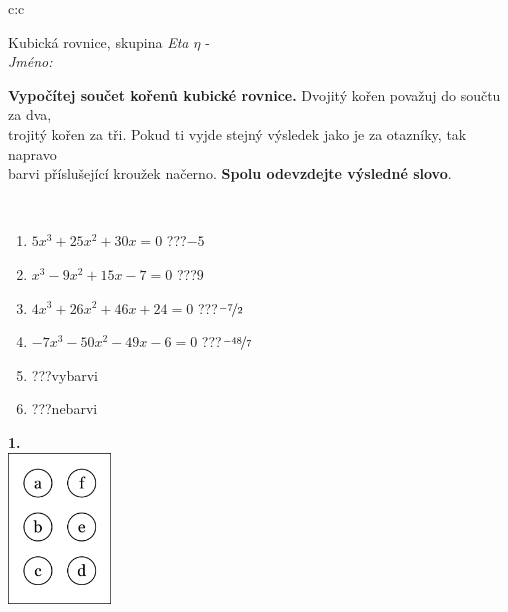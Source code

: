 \documentclass[10pt]{report}
\begin{document}
\begin{tabular}{c:c}
\begin{minipage}[c][104.5mm][t]{0.5\linewidth}
\begin{center}
\vspace{7mm}
{\huge Kubická rovnice, skupina \textit{Eta $\eta$} -}\\[5mm]
\textit{Jméno:}\phantom{xxxxxxxxxxxxxxxxxxxxxxxxxxxxxxxxxxxxxxxxxxxxxxxxxxxxxxxxxxxxxxxxx}\\[5mm]
\begin{minipage}{0.95\linewidth}
\begin{center}
\textbf{Vypočítej součet kořenů kubické rovnice.} Dvojitý kořen považuj do součtu za dva,\\trojitý kořen za tři. Pokud ti vyjde stejný výsledek jako je za otazníky, tak napravo\\barvi příslušející kroužek načerno. \textbf{Spolu odevzdejte výsledné slovo}.
\end{center}
\end{minipage}
\\[1mm]
\begin{minipage}{0.79\linewidth}
\begin{center}
\begin{varwidth}{\linewidth}
\begin{enumerate}
\Large
\item $5x^3+25x^2+30x=0$\quad \dotfill\; ???\;\dotfill \quad $-5$
\item $x^3-9x^2+15x-7=0$\quad \dotfill\; ???\;\dotfill \quad $9$
\item $4x^3+26x^2+46x+24=0$\quad \dotfill\; ???\;\dotfill \quad $\nicefrac{-7}{2}$
\item $-7x^3-50x^2-49x-6=0$\quad \dotfill\; ???\;\dotfill \quad $\nicefrac{-48}{7}$
\item \quad \dotfill\; ???\;\dotfill \quad vybarvi
\item \quad \dotfill\; ???\;\dotfill \quad nebarvi
\end{enumerate}
\end{varwidth}
\end{center}
\end{minipage}
\begin{minipage}{0.20\linewidth}
\begin{center}
{\Huge\bfseries 1.} \\[2mm]
\includegraphics[height=40mm]{../images/braille.png}

\end{center}
\end{minipage}
\end{center}
\end{minipage}
\end{tabular}
\end{document}
